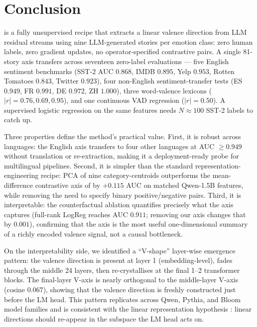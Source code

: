 \section{Conclusion}
\label{sec:conclusion}

\ours{} is a fully unsupervised recipe that extracts a linear valence
direction from LLM residual streams using nine LLM-generated stories per
emotion class: zero human labels, zero gradient updates, no
operator-specified contrastive pairs. A single 81-story axis transfers
across seventeen zero-label evaluations --- five English sentiment
benchmarks (SST-2 AUC $0.868$, IMDB $0.895$, Yelp $0.953$, Rotten
Tomatoes $0.843$, Twitter $0.923$), four non-English sentiment-transfer
tests (ES $0.949$, FR $0.991$, DE $0.972$, ZH $1.000$), three
word-valence lexicons ($|r|=0.76, 0.69, 0.95$), and one continuous VAD
regression ($|r|=0.50$). A supervised logistic regression on the same
features needs $N\!\approx\!100$ SST-2 labels to catch up.

Three properties define the method's practical value. First, it is robust
across languages: the English axis transfers to four other languages at
AUC $\geq 0.949$ without translation or re-extraction, making it a
deployment-ready probe for multilingual pipelines. Second, it is simpler
than the standard representation-engineering recipe: PCA of nine
category-centroids outperforms the mean-difference contrastive axis of
\cite{zou2023representation, rimsky2024steering, arditi2024refusal} by
$+0.115$ AUC on matched Qwen-1.5B features, while removing the need to
specify binary positive/negative pairs. Third, it is interpretable: the
counterfactual ablation quantifies precisely what the axis captures
(full-rank LogReg reaches AUC $0.911$; removing our axis changes that by
$0.001$), confirming that the axis is the most useful one-dimensional
summary of a richly encoded valence signal, not a causal bottleneck.

On the interpretability side, we identified a ``V-shape'' layer-wise
emergence pattern: the valence direction is present at layer 1
(embedding-level), fades through the middle 24 layers, then
re-crystallises at the final 1--2 transformer blocks. The final-layer
V-axis is nearly orthogonal to the middle-layer V-axis (cosine $0.067$),
showing that the valence direction is freshly constructed just before the
LM head. This pattern replicates across Qwen, Pythia, and Bloom model
families and is consistent with the linear representation hypothesis
\cite{park2024linear}: linear directions should re-appear in the subspace
the LM head acts on.

